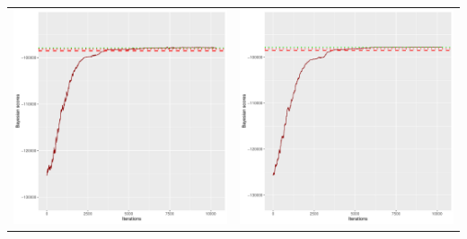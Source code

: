\documentclass[]{scrartcl}
\begin{document}
\begin{table}[h!]
\begin{tabular}{cc}
\includegraphics[scale = 0.4]{./figs/hepar2/v3/25/bayBoundsEvolution-10352.pdf} & 
\includegraphics[scale = 0.4]{./figs/hepar2/v3/50/bayBoundsEvolution-10352.pdf} \\

\end{tabular}
\end{table}
\end{document}
